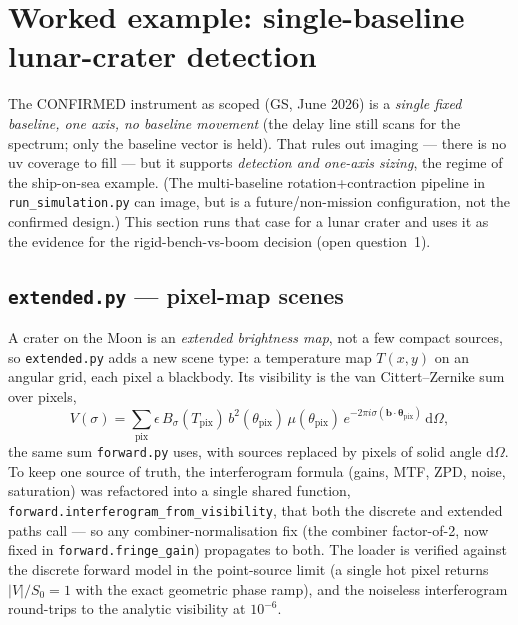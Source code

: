 \documentclass[11pt]{article}
\newcommand{\code}[1]{\texttt{\small #1}}
\newcommand{\file}[1]{\textcolor{plumdark}{\texttt{\small #1}}}
\begin{document}
\section{Worked example: single-baseline lunar-crater detection}

The CONFIRMED instrument as scoped (GS, June 2026) is a \emph{single fixed
baseline, one axis, no baseline movement} (the delay line still scans for the
spectrum; only the baseline vector is held). That rules out imaging --- there
is no uv coverage to fill --- but it supports \emph{detection and one-axis
sizing}, the regime of the ship-on-sea example. (The multi-baseline
rotation+contraction pipeline in \code{run\_simulation.py} can image, but is a
future/non-mission configuration, not the confirmed design.) This section runs that case for a lunar crater
and uses it as the evidence for the rigid-bench-vs-boom decision (open
question~1).

\subsection{\file{extended.py} --- pixel-map scenes}

\begin{decisionbox}
A crater on the Moon is an \emph{extended brightness map}, not a few compact
sources, so \file{extended.py} adds a new scene type: a temperature map
$T(x,y)$ on an angular grid, each pixel a blackbody. Its visibility is the
van Cittert--Zernike sum over pixels,
\[
V(\sigma) = \sum_{\mathrm{pix}} \epsilon\, B_\sigma(T_{\mathrm{pix}})\,
b^2(\theta_{\mathrm{pix}})\,\mu(\theta_{\mathrm{pix}})\,
e^{-2\pi i\sigma(\mathbf b\cdot\boldsymbol\theta_{\mathrm{pix}})}\,\mathrm{d}\Omega,
\]
the same sum \file{forward.py} uses, with sources replaced by pixels of solid
angle $\mathrm{d}\Omega$. To keep one source of truth, the interferogram
formula (gains, MTF, ZPD, noise, saturation) was refactored into a single
shared function, \code{forward.interferogram\_from\_visibility}, that both
the discrete and extended paths call --- so any combiner-normalisation fix
(the combiner factor-of-2, now fixed in \code{forward.fringe\_gain})
propagates to both. The loader is verified
against the discrete forward model in the point-source limit (a single hot
pixel returns $|V|/S_0 = 1$ with the exact geometric phase ramp), and the
noiseless interferogram round-trips to the analytic visibility at $10^{-6}$.
\end{decisionbox}
\end{document}
